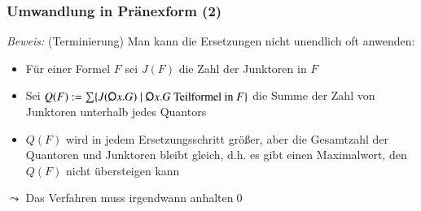 \documentclass[onlymath]{beamer}
\begin{document}
\begin{frame}[t]\frametitle{Umwandlung in Pränexform (2)}


\emph{Beweis:} (Terminierung) Man kann die Ersetzungen nicht unendlich oft anwenden:\pause
\begin{itemize}
\item Für einer Formel $F$ sei $J(F)$ die Zahl der Junktoren in $F$
\item Sei $Q(F)\defeq \sum\{J(\quantor x.G)\mid \quantor x.G\text{ Teilformel in }F\}$
die Summe der Zahl von Junktoren unterhalb jedes Quantors\pause
\item $Q(F)$ wird in jedem Ersetzungsschritt größer, aber die Gesamtzahl der Quantoren und Junktoren bleibt gleich, d.h. es gibt
einen Maximalwert, den $Q(F)$ nicht übersteigen kann
\end{itemize}
$\leadsto$ Das Verfahren muss irgendwann anhalten\qed

\end{frame}
\end{document}
